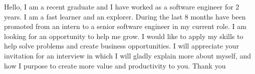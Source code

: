 Hello, I am a recent graduate and I have worked as a software engineer for 2 years. I am a fast learner and an explorer.  During the last 8 months have been promoted from an intern to a senior software engineer in my current role. I am looking for an opportunity to help me grow. I would like to apply my skills to help solve problems and create business opportunities. I will appreciate your invitation for an interview in which I will gladly explain more about myself, and how I purpose to create more value and productivity to you. Thank you